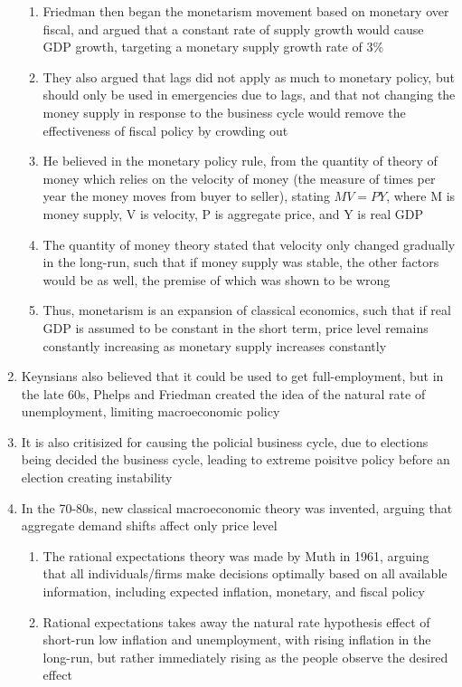 \documentclass[11 pt, twoside]{article}
\begin{document}
\begin{enumerate}
\begin{enumerate}
\item Friedman then began the monetarism movement based on monetary over fiscal, and argued that a constant rate of supply growth would cause GDP growth, targeting a monetary supply growth rate of 3\%
\item They also argued that lags did not apply as much to monetary policy, but should only be used in emergencies due to lags, and that not changing the money supply in response to the business cycle would remove the effectiveness of fiscal policy by crowding out
\item He believed in the monetary policy rule, from the quantity of theory of money which relies on the velocity of money (the measure of times per year the money moves from buyer to seller), stating $MV = PY$, where M is money supply, V is velocity, P is aggregate price, and Y is real GDP
\item The quantity of money theory stated that velocity only changed gradually in the long-run, such that if money supply was stable, the other factors would be as well, the premise of which was shown to be wrong
\item Thus, monetarism is an expansion of classical economics, such that if real GDP is assumed to be constant in the short term, price level remains constantly increasing as monetary supply increases constantly
\end{enumerate}
\item Keynsians also believed that it could be used to get full-employment, but in the late 60s, Phelps and Friedman created the idea of the natural rate of unemployment, limiting macroeconomic policy
\item It is also critisized for causing the policial business cycle, due to elections being decided the business cycle, leading to extreme poisitve policy before an election creating instability
\item In the 70-80s, new classical macroeconomic theory was invented, arguing that aggregate demand shifts affect only price level
\begin{enumerate}
\item The rational expectations theory was made by Muth in 1961, arguing that all individuals/firms make decisions optimally based on all available information, including expected inflation, monetary, and fiscal policy
\item Rational expectations takes away the natural rate hypothesis effect of short-run low inflation and unemployment, with rising inflation in the long-run, but rather immediately rising as the people observe the desired effect

\end{enumerate}
\end{enumerate}
\end{document}
